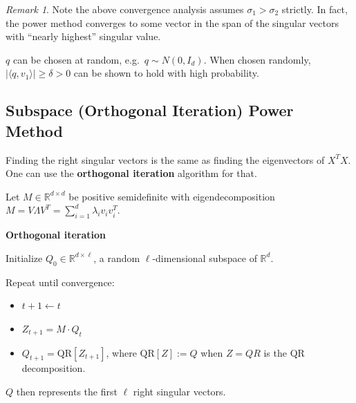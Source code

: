 \documentclass[
  letterpaper,
  DIV=11,
  numbers=noendperiod]{scrreprt}
\providecommand{\tightlist}{%
  \setlength{\itemsep}{0pt}\setlength{\parskip}{0pt}}
\theoremstyle{definition}
\theoremstyle{plain}
\theoremstyle{plain}
\theoremstyle{definition}
\theoremstyle{plain}
\theoremstyle{plain}
\theoremstyle{remark}
\newtheorem*{remark}{Remark}
\begin{document}
\begin{remark}
Note the above convergence analysis assumes \(\sigma_1 > \sigma_2\)
strictly. In fact, the power method converges to some vector in the span
of the singular vectors with ``nearly highest'' singular value.

\(q\) can be chosen at random, e.g.~\(q \sim N(0, I_d)\). When chosen
randomly, \(|\langle q, v_1\rangle| \ge \delta > 0\) can be shown to
hold with high probability.
\end{remark}

\subsection{Subspace (Orthogonal Iteration) Power
Method}\label{subspace-orthogonal-iteration-power-method}

Finding the right singular vectors is the same as finding the
eigenvectors of \(X^T X\). One can use the \textbf{orthogonal iteration}
algorithm for that.

Let \(M \in \mathbb{R}^{d \times d}\) be positive semidefinite with
eigendecomposition
\(M = V \Lambda V^T = \sum_{i=1}^{d} \lambda_i v_i v_i^T\).

\begin{tcolorbox}[enhanced jigsaw, leftrule=.75mm, bottomrule=.15mm, left=2mm, colback=white, colframe=quarto-callout-note-color-frame, toprule=.15mm, breakable, arc=.35mm, rightrule=.15mm, opacityback=0]
\begin{minipage}[t]{5.5mm}
\textcolor{quarto-callout-note-color}{\faInfo}
\end{minipage}%
\begin{minipage}[t]{\textwidth - 5.5mm}

\textbf{Orthogonal iteration}

Initialize \(Q_0 \in \mathbb{R}^{d \times \ell}\), a random
\(\ell\)-dimensional subspace of \(\mathbb{R}^d\).

Repeat until convergence:

\begin{itemize}
\tightlist
\item
  \(t + 1 \leftarrow t\)
\item
  \(Z_{t+1} = M \cdot Q_t\)
\item
  \(Q_{t+1} = \mathrm{QR}[Z_{t+1}]\), where \(\mathrm{QR}[Z] := Q\) when
  \(Z = QR\) is the QR decomposition.
\end{itemize}

\(Q\) then represents the first \(\ell\) right singular vectors.

\end{minipage}%
\end{tcolorbox}
\end{document}
